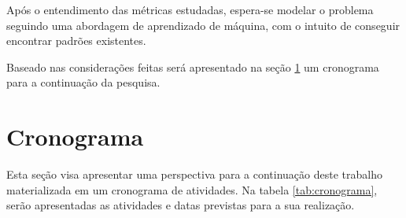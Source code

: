 Após o entendimento das métricas estudadas, espera-se 
modelar o problema seguindo uma abordagem de aprendizado de
máquina, com o intuito de conseguir encontrar padrões existentes.

Baseado nas considerações feitas será apresentado na seção
\ref{sec:cronograma} um cronograma para a continuação da pesquisa.

\section{Cronograma} \label{sec:cronograma}

Esta seção visa apresentar uma perspectiva para a continuação deste trabalho
materializada em um cronograma de atividades. Na tabela \ref{tab:cronograma},
serão apresentadas as atividades e datas previstas para a sua realização.

\begin{table}[h]
\caption{Cronograma}
\label{tab:cronograma}
\end{table}

